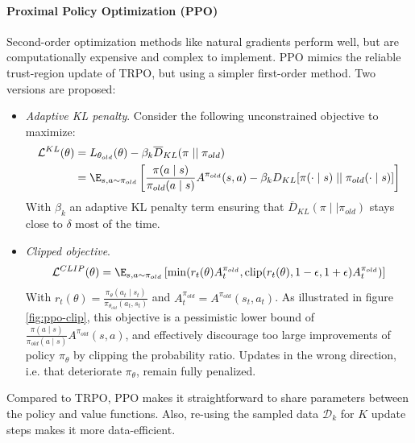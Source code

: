 \paragraph{Proximal Policy Optimization (PPO) \cite{schulman2017proximal}}
Second-order optimization methods like natural gradients perform well, but are computationally expensive and complex to implement. PPO mimics the reliable trust-region update of TRPO, but using a simpler first-order method. Two versions are proposed:
\begin{itemize}
    \item \emph{Adaptive KL penalty}. Consider the following unconstrained objective to maximize:
    \begin{align*}
        \mathcal{L}^{KL}(\theta) 
        &= L_{\theta_{old}}(\theta) - 
        \beta_k \overline{D}_{KL}(\pi\mid \mid \pi_{old}) \\
        &= \E_{s,a\sim \pi_{old}} \left[
            \frac{\pi(a\mid s)}{\pi_{old}(a\mid s)} A^{\pi_{old}}(s,a)
            - \beta_k D_{KL}[\pi(\cdot\mid s)\mid \mid \pi_{old}(\cdot\mid s)]
        \right]
    \end{align*}
    With $\beta_k$ an adaptive KL penalty term ensuring that $\overline{D}_{KL}(\pi\mid \mid \pi_{old})$ stays close to $\delta$ most of the time.
    \item \emph{Clipped objective}.
    \[
        \mathcal{L}^{CLIP}(\theta) 
        = \E_{s,a\sim \pi_{old}} \left[
            \min(r_t(\theta) A^{\pi_{old}}_t, \text{clip}(r_t(\theta), 1-\epsilon, 1+\epsilon) A^{\pi_{old}}_t)
        \right]
    \]
    With $r_t(\theta) = \frac{\pi_\theta(a_t\mid s_t)}{\pi_{\theta_{old}}(a_t,s_t)}$ and $A^{\pi_{old}}_t = A^{\pi_{old}}(s_t,a_t)$. As illustrated in figure \ref{fig:ppo-clip}, this objective is a pessimistic lower bound of $\frac{\pi(a\mid s)}{\pi_{old}(a\mid s)} A^{\pi_{old}}(s,a)$, and effectively discourage too large improvements of policy $\pi_\theta$ by clipping the probability ratio. Updates in the wrong direction, i.e. that deteriorate $\pi_\theta$, remain fully penalized. 
\end{itemize}
Compared to TRPO, PPO makes it straightforward to share parameters between the policy and value functions. Also, re-using the sampled data $\mathcal{D}_k$ for $K$ update steps makes it more data-efficient.


